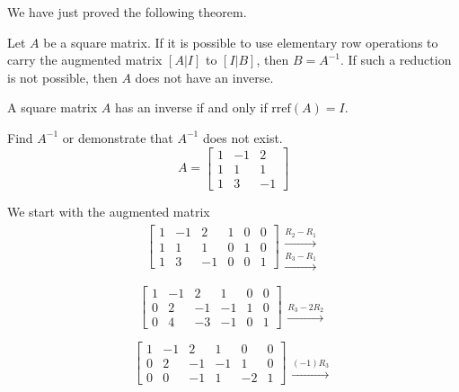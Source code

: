 \documentclass{ximera}
\begin{document}
We have just proved the following theorem.

\begin{theorem}\label{th:matrixinverse}
Let $A$ be a square matrix.  If it is possible to use elementary row operations to carry the augmented matrix $[A|I]$ to $[I|B]$, then $B=A^{-1}$.  If such a reduction is not possible, then $A$ does not have an inverse.
\end{theorem}

\begin{corollary}
A square matrix $A$ has an inverse if and only if $\mbox{rref}(A)=I$.
\end{corollary}

\begin{example}\label{ex:inverse3} Find $A^{-1}$ or demonstrate that $A^{-1}$ does not exist.
$$A=\begin{bmatrix}1&-1&2\\1&1&1\\1&3&-1\end{bmatrix}$$
\begin{explanation}
We start with the augmented matrix
$$\left[\begin{array}{ccc|ccc}  
 1&-1&2&1&0&0\\1&1&1&0&1&0\\1&3&-1&0&0&1
 \end{array}\right]
  \begin{array}{c}
 \\
 \xrightarrow{R_2-R_1}\\
 \xrightarrow{R_3-R_1}
 \end{array}$$
 
  $$\left[\begin{array}{ccc|ccc}  
 1&-1&2&1&0&0\\0&2&-1&-1&1&0\\0&4&-3&-1&0&1
 \end{array}\right]
  \begin{array}{c}
 \\
 \\
 \xrightarrow{R_3-2R_2}
 \end{array}$$
 
 $$\left[\begin{array}{ccc|ccc}  
 1&-1&2&1&0&0\\0&2&-1&-1&1&0\\0&0&-1&1&-2&1
 \end{array}\right]
 \begin{array}{c}
 \\
 \\
 \xrightarrow{(-1)R_3}
 \end{array}$$
 

\end{explanation}
\end{example}
\end{document}
